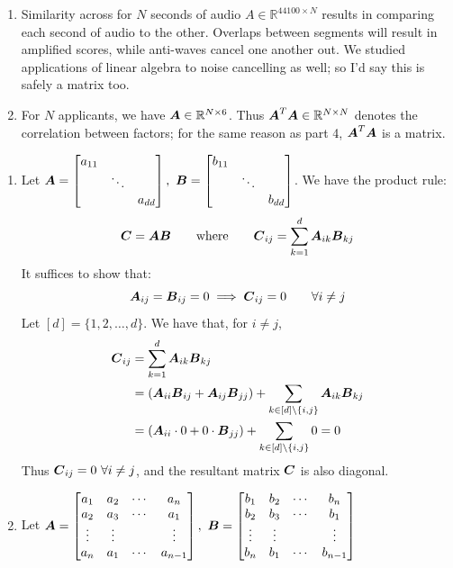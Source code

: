 \documentclass[]{exam}
\begin{document}
\begin{questions}
\begin{enumerate}[label=\arabic*.]
	\item Similarity across for $N$ seconds of audio $A \in \mathbb{R}^{44100 \times N}$ results in comparing each second of audio to the other. Overlaps between segments will result in amplified scores, while anti-waves cancel one another out. We studied applications of linear algebra to noise cancelling as well; so I'd say this is safely a matrix too.
	\item For $N$ applicants, we have $\boldsymbol{A} \in \mathbb{R}^{N \times 6}$. Thus $\boldsymbol{A}^T \boldsymbol{A} \in \mathbb{R}^{N \times N}$ denotes the correlation between factors; for the same reason as part 4, $\boldsymbol{A}^T \boldsymbol{A}$ is a matrix.
\end{enumerate}

\newpage
\question
\hfill

\begin{enumerate}[label=\arabic*.]
	\item Let $\boldsymbol{A} = \begin{bmatrix} a_{11} & & \\ & \ddots \\ & & a_{dd} \end{bmatrix},~\boldsymbol{B} = \begin{bmatrix} b_{11} & & \\ & \ddots \\ & & b_{dd} \end{bmatrix}$. We have the product rule:
		$$
		\boldsymbol{C} = \boldsymbol{A} \boldsymbol{B} \qquad \text{where} \qquad \boldsymbol{C}_{ij} = \sum^{d}_{k=1} \boldsymbol{A}_{ik} \boldsymbol{B}_{kj}
		$$
		It suffices to show that:
		$$
		\boldsymbol{A}_{ij} = \boldsymbol{B}_{ij} = 0 \implies
		\boldsymbol{C}_{ij} = 0 \qquad \forall i \neq j
		$$
		Let $[d] = \{1, 2, \ldots, d\}$. We have that, for $i \neq j$,
		\begin{align*}
			\boldsymbol{C}_{ij} &= \sum^{d}_{k=1} \boldsymbol{A}_{ik} \boldsymbol{B}_{kj} \\
			&= (\boldsymbol{A}_{ii} \boldsymbol{B}_{ij} + \boldsymbol{A}_{ij} \boldsymbol{B}_{jj}) + \sum_{k \in [d] \setminus \{i, j\}} \boldsymbol{A}_{ik} \boldsymbol{B}_{kj} \\
			&= (\boldsymbol{A}_{ii} \cdot 0 + 0 \cdot \boldsymbol{B}_{jj}) + \sum_{k \in [d] \setminus \{i, j\}} 0 = 0 
		\end{align*}
		Thus $\boldsymbol{C}_{ij} = 0~\forall i \neq j$, and the resultant matrix $\boldsymbol{C}$ is also diagonal.
	\item Let $\boldsymbol{A} = \begin{bmatrix} a_{1} & a_2 & \cdots & a_n \\ a_2 & a_3 & \cdots & a_{1} \\ \vdots & \vdots & & \vdots \\ a_n & a_1 & \cdots & a_{n-1} \end{bmatrix},~\boldsymbol{B} = \begin{bmatrix} b_{1} & b_2 & \cdots & b_n \\ b_2 & b_3 & \cdots & b_{1} \\ \vdots & \vdots & & \vdots \\ b_n & b_1 & \cdots & b_{n-1} \end{bmatrix}$


\end{enumerate}
\end{questions}
\end{document}
